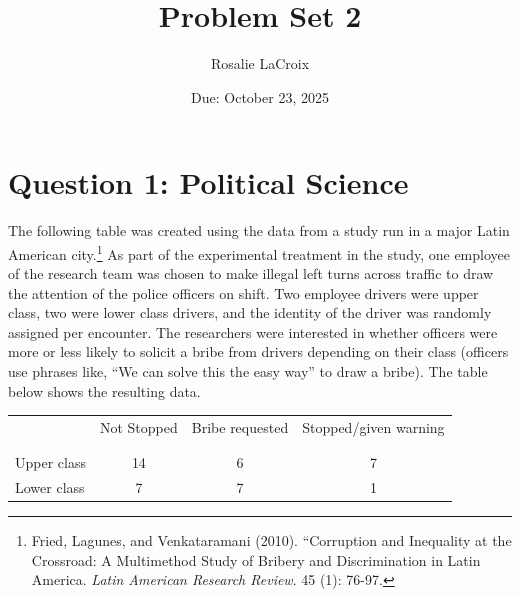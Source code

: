 \documentclass[12pt,letterpaper]{article}
\title{Problem Set 2}
\date{Due: October 23, 2025}
\author{Rosalie LaCroix}
\begin{document}
	\maketitle


	
	\vspace{.5cm}
	\section*{Question 1: Political Science}
		\vspace{.25cm}
	The following table was created using the data from a study run in a major Latin American city.\footnote{Fried, Lagunes, and Venkataramani (2010). ``Corruption and Inequality at the Crossroad: A Multimethod Study of Bribery and Discrimination in Latin America. \textit{Latin American Research Review}. 45 (1): 76-97.} As part of the experimental treatment in the study, one employee of the research team was chosen to make illegal left turns across traffic to draw the attention of the police officers on shift. Two employee drivers were upper class, two were lower class drivers, and the identity of the driver was randomly assigned per encounter. The researchers were interested in whether officers were more or less likely to solicit a bribe from drivers depending on their class (officers use phrases like, ``We can solve this the easy way'' to draw a bribe). The table below shows the resulting data.

\begin{table}[h!]
	\centering
	\begin{tabular}{l | c c c }
		& Not Stopped & Bribe requested & Stopped/given warning \\
		\\[-1.8ex] 
		\hline \\[-1.8ex]
		Upper class & 14 & 6 & 7 \\
		Lower class & 7 & 7 & 1 \\
		\hline
	\end{tabular}
\end{table}
\end{document}

